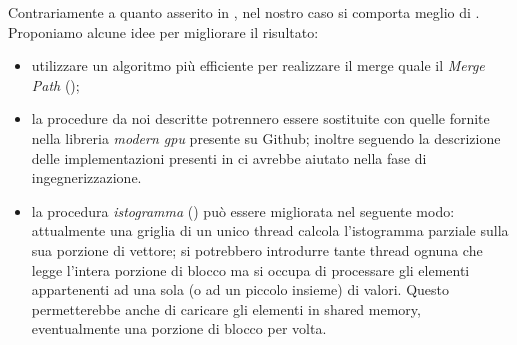 Contrariamente a quanto asserito in \cite{parallelTrans}, nel nostro caso \ScanTrans{} si comporta meglio di \MergeTrans{}. Proponiamo alcune idee per migliorare il risultato:
\begin{itemize}
	\item utilizzare un algoritmo più efficiente per realizzare il merge quale il \textit{Merge Path} (\cite{mergepath});
	\item la procedure da noi descritte potrennero essere sostituite con quelle fornite nella libreria \textit{modern gpu} presente su Github; inoltre seguendo la descrizione delle implementazioni presenti in \cite{moderngpu} ci avrebbe aiutato nella fase di ingegnerizzazione.
	\item la procedura \emph{istogramma} () può essere migliorata nel seguente modo: attualmente una griglia di un unico thread calcola l'istogramma parziale sulla sua porzione di vettore; si potrebbero introdurre tante thread ognuna che legge l'intera porzione di blocco ma si occupa di processare gli elementi appartenenti ad una sola (o ad un piccolo insieme) di valori. Questo permetterebbe anche di caricare gli elementi in shared memory, eventualmente una porzione di blocco per volta.
\end{itemize}

